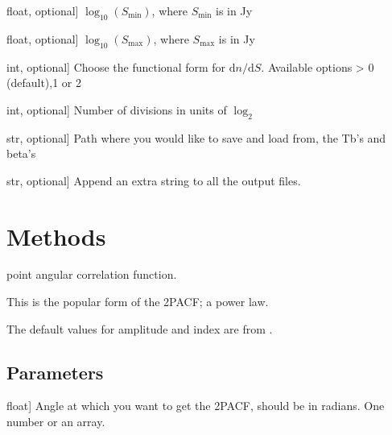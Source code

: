 \documentclass[letterpaper,10pt,english]{sphinxmanual}
\begin{document}
\begin{fulllineitems}
\begin{description}
\sphinxlineitem{logSmin}{[}float, optional{]}
\sphinxAtStartPar
\(\log_{10}(S_{\mathrm{min}})\), where \(S_{\mathrm{min}}\) is in Jy

\sphinxlineitem{logSmax}{[}float, optional{]}
\sphinxAtStartPar
\(\log_{10}(S_{\mathrm{max}})\), where \(S_{\mathrm{max}}\) is in Jy

\sphinxlineitem{dndS\_form}{[}int, optional{]}
\sphinxAtStartPar
Choose the functional form for \(\mathrm{d}n/\mathrm{d}S\). Available options \sphinxhyphen{}\textgreater{} 0 (default),1 or 2

\sphinxlineitem{log2Nside}{[}int, optional{]}
\sphinxAtStartPar
Number of divisions in units of \(\log_2\)

\sphinxlineitem{path}{[}str, optional{]}
\sphinxAtStartPar
Path where you would like to save and load from, the Tb’s and beta’s

\sphinxlineitem{lbl}{[}str, optional{]}
\sphinxAtStartPar
Append an extra string to all the output files.

\end{description}


\section{Methods}
\label{\detokenize{api:methods}}

\begin{fulllineitems}
\label{\detokenize{api:furs.furs.acf}}
\pysigstartsignatures
{}
\pysigstopsignatures
{} point angular correlation function.

\sphinxAtStartPar
This is the popular form of the 2PACF; a power law.

\sphinxAtStartPar
The default values for amplitude and index are from .


\subsection{Parameters}
\label{\detokenize{api:id2}}\begin{description}
\sphinxlineitem{chi}{[}float{]}
\sphinxAtStartPar
Angle at which you want to get the 2PACF, should be in radians. One number or an array.

\end{description}



\end{fulllineitems}
\end{fulllineitems}
\end{document}
